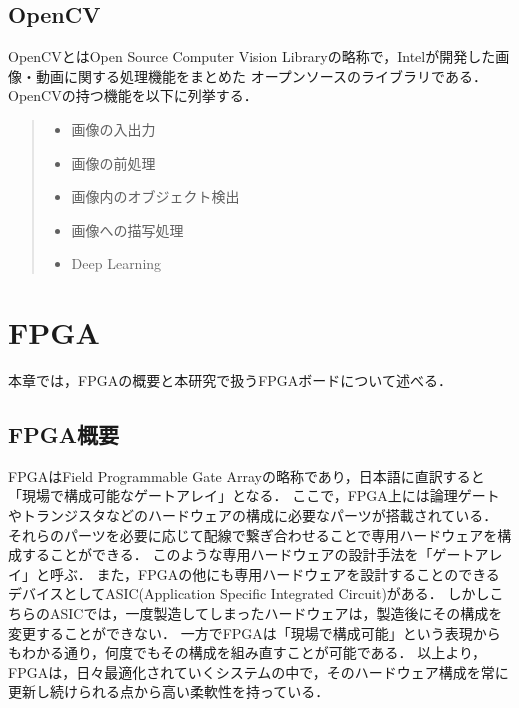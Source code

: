 \documentclass[11pt,a4j]{jreport}
\begin{document}

\subsection{OpenCV}
OpenCVとはOpen Source Computer Vision Libraryの略称で，Intelが開発した画像・動画に関する処理機能をまとめた
オープンソースのライブラリである．OpenCVの持つ機能\cite{OpenCV}を以下に列挙する．
\begin{quote}
  \begin{itemize}
    \item 画像の入出力
    \item 画像の前処理
    \item 画像内のオブジェクト検出
    \item 画像への描写処理
    \item Deep Learning
  \end{itemize}
\end{quote}

\section{FPGA}
本章では，FPGAの概要と本研究で扱うFPGAボードについて述べる．
\subsection{FPGA概要}
FPGAはField Programmable Gate Arrayの略称であり，日本語に直訳すると「現場で構成可能なゲートアレイ」となる．
ここで，FPGA上には論理ゲートやトランジスタなどのハードウェアの構成に必要なパーツが搭載されている．
それらのパーツを必要に応じて配線で繋ぎ合わせることで専用ハードウェアを構成することができる．
このような専用ハードウェアの設計手法を「ゲートアレイ」と呼ぶ．
また，FPGAの他にも専用ハードウェアを設計することのできるデバイスとしてASIC(Application Specific Integrated Circuit)がある．
しかしこちらのASICでは，一度製造してしまったハードウェアは，製造後にその構成を変更することができない．
一方でFPGAは「現場で構成可能」という表現からもわかる通り，何度でもその構成を組み直すことが可能である．
以上より，FPGAは，日々最適化されていくシステムの中で，そのハードウェア構成を常に更新し続けられる点から高い柔軟性を持っている．
\end{document}
